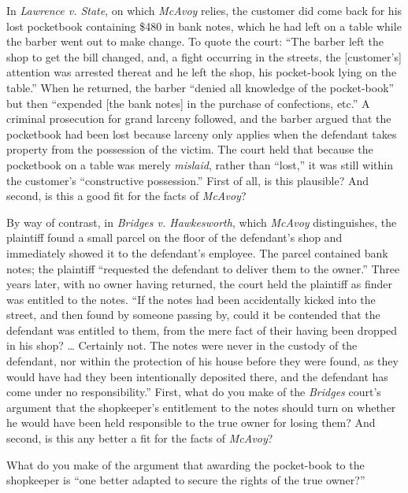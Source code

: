 
\item In \textit{Lawrence v. State}, on which \textit{McAvoy} relies, the
customer did come back for his lost pocketbook containing \$480 in bank notes,
which he had left on a table while the barber went out to make change. To quote
the court: ``The barber left the shop to get the bill changed, and, a fight
occurring in the streets, the [customer's] attention was arrested thereat and
he left the shop, his pocket-book lying on the table.'' When he returned, the
barber ``denied all knowledge of the pocket-book'' but then ``expended [the
bank notes] in the purchase of confections, etc.'' A criminal prosecution for
grand larceny followed, and the barber argued that the pocketbook had been lost
because larceny only applies when the defendant takes property from the
possession of the victim. The court held that because the pocketbook on a table
was merely \textit{mislaid}, rather than ``lost,'' it was still within the
customer's ``constructive possession.'' First of all, is this plausible? And
second, is this a good fit for the facts of \textit{McAvoy}?


\item By way of contrast, in \textit{Bridges v. Hawkesworth}, which
\textit{McAvoy} distinguishes, the plaintiff found a small parcel on the floor
of the defendant's shop and immediately showed it to the defendant's employee.
The parcel contained bank notes; the plaintiff ``requested the defendant to
deliver them to the owner.'' Three years later, with no owner having returned,
the court held the plaintiff as finder was entitled to the notes. ``If the
notes had been accidentally kicked into the street, and then found by someone
passing by, could it be contended that the defendant was entitled to them, from
the mere fact of their having been dropped in his shop? \dots{} Certainly not.
The notes were never in the custody of the defendant, nor within the protection
of his house before they were found, as they would have had they been
intentionally deposited there, and the defendant has come under no
responsibility.'' First, what do you make of the \textit{Bridges} court's
argument that the shopkeeper's entitlement to the notes should turn on whether
he would have been held responsible to the true owner for losing them? And
second, is this any better a fit for the facts of \textit{McAvoy}?


\item What do you make of the argument that awarding the pocket-book to the
shopkeeper is ``one better adapted to secure the rights of the true owner?''


